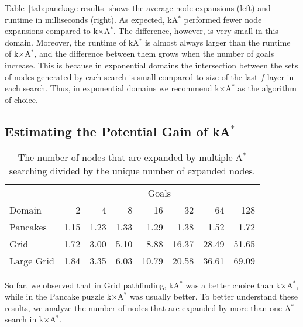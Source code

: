 \documentclass[smallextended]{svjour3}       %
\newcommand{\astar}{A$^*$\xspace}
\newcommand{\kastar}{kA$^*$\xspace}
\newcommand{\kxastar}{k$\times$A$^*$\xspace}
\newcommand{\astari}[1]{A$^*_{#1}$\xspace}
\newcommand{\Exp}{\text{Exp}}
\begin{document}
Table~\ref{tab:panckage-results} shows the average node expansions (left) and runtime in milliseconds (right). As expected, \kastar performed fewer node expansions compared to \kxastar. The difference, however, is very small in this domain. 
Moreover, the runtime of \kastar is almost always larger than the runtime of \kxastar, and the difference between them grows when the number of goals increase.
This is because in exponential domains the intersection between the sets of nodes generated by each search is small compared to size of the last $f$ layer in each search. Thus, in exponential domains we recommend \kxastar as the algorithm of choice. 


\subsection{Estimating the Potential Gain of \kastar}


\begin{table}[h!]
	\centering
	\begin{tabular}{lrrrrrrr}
\toprule
 &\multicolumn{7}{c}{Goals}\\
\cmidrule(l){2-8}
Domain & 2 & 4 & 8 & 16 & 32 & 64 & 128 \\
\midrule
Pancakes & 1.15 & 1.23 & 1.33 & 1.29 & 1.38 & 1.52 & 1.72 \\
Grid & 1.72 & 3.00 & 5.10 & 8.88 & 16.37 & 28.49 & 51.65 \\
Large Grid & 1.84 & 3.35 & 6.03 & 10.79 & 20.58 & 36.61 & 69.09 \\
\bottomrule
	\end{tabular}
\caption{The number of nodes that are expanded by multiple \astar searching divided by the unique number of expanded nodes.}
\label{tab:potential}
\end{table}




So far, we observed that in Grid pathfinding, \kastar was a better choice than \kxastar, while in the Pancake puzzle \kxastar was usually better. To better understand these results, we analyze the number of nodes that are expanded by more than one \astar search in \kxastar. 
\end{document}
